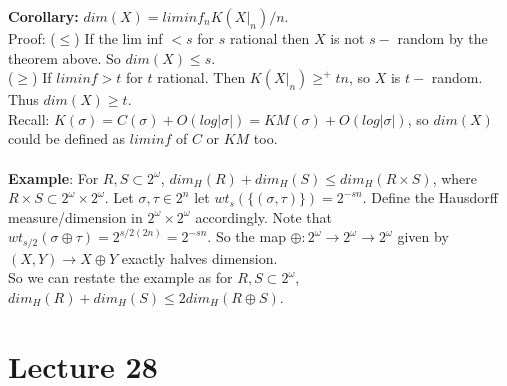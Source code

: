 \documentclass{article}
\begin{document}
  \textbf{Corollary:} $dim(X) = liminf_n K(X|_n) / n$. \\
  Proof: ($\leq$) If the lim inf $< s$ for $s$ rational then $X$ is not $s-$ random by the theorem above. So $dim(X) \leq s$.\\
  ($\geq$) If $lim inf > t$ for $t$ rational. Then $K(X|_n) \geq^+ tn$, so $X$ is $t-$ random. Thus $dim(X) \geq t$. \\
  Recall: $K(\sigma) = C(\sigma) + O(log|\sigma|) = KM(\sigma) + O(log |\sigma|)$, so $dim(X)$ could be defined as $lim inf$ of $C$ or $KM$ too.\\
  \\
  \textbf{Example}: For $R,S \subset 2^\omega$, $dim_H(R) + dim_H(S) \leq dim_H(R\times S)$, where $R\times S \subset 2^\omega \times 2^\omega$. Let $\sigma,\tau \in 2^n$ let $wt_s(\{(\sigma,\tau)\}) = 2^{-sn}$. Define the Hausdorff measure/dimension in $2^\omega \times 2^\omega $ accordingly. Note that $wt_{s/2} (\sigma \oplus \tau) = 2^{s/2(2n)} = 2^{-sn}$. So the map $\oplus: 2^\omega \to 2^\omega \to 2^\omega$ given by $(X,Y) \to X \oplus Y$ exactly halves dimension.\\
  So we can restate the example as for $R,S \subset 2^\omega$, $dim_H(R) + dim_H(S) \leq 2 dim_H(R \oplus S)$.
  \newpage
  \section{Lecture 28}
\end{document}
